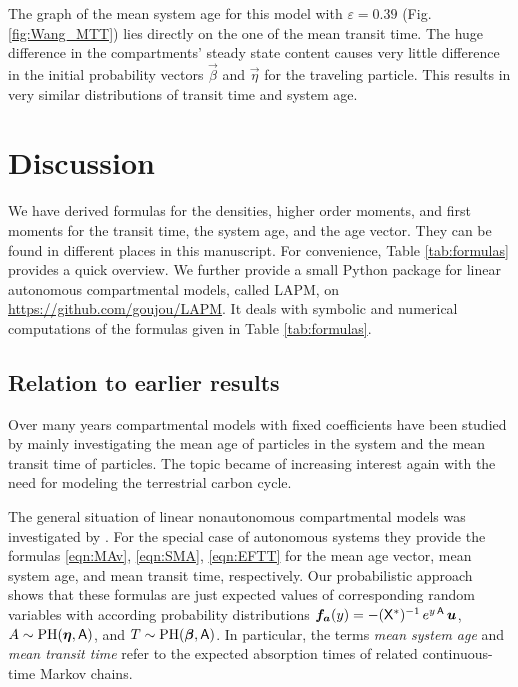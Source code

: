 \documentclass[smallextended]{svjour3}
\begin{document}
The graph of the mean system age for this model with $\varepsilon = 0.39$ (Fig. \ref{fig:Wang_MTT}) lies directly on the one of the mean transit time.
The huge difference in the compartments' steady state content causes very little difference in the initial probability vectors $\vec{\beta}$ and $\vec{\eta}$ for the traveling particle.
This results in very similar distributions of transit time and system age.

\section{Discussion}
We have derived formulas for the densities, higher order moments, and first moments for the transit time, the system age, and the age vector.
They can be found in different places in this manuscript.
For convenience, Table \ref{tab:formulas} provides a quick overview.
We further provide a small Python package for linear autonomous compartmental models, called LAPM, on \url{https://github.com/goujou/LAPM}.
It deals with symbolic and numerical computations of the formulas given in Table \ref{tab:formulas}.

\subsection{Relation to earlier results}
Over many years compartmental models with fixed coefficients have been studied \citep{Eriksson1971ARoEaS, bolin1973Tellus, Anderson1983} by mainly investigating the mean age of particles in the system and the mean transit time of particles.
The topic became of increasing interest again with the need for modeling the terrestrial carbon cycle.

The general situation of linear nonautonomous compartmental models was investigated by \citet{Rasmussen2016JMB}.
For the special case of autonomous systems they provide the formulas \eqref{eqn:MAv}, \eqref{eqn:SMA}, \eqref{eqn:EFTT} for the mean age vector, mean system age, and mean transit time, respectively.
Our probabilistic approach shows that these formulas are just expected values of corresponding random variables with according probability distributions $\vec{f_a}(y) = -(\tens{X}^\ast)^{-1}\, e^{y\,\tens{A}}\,\vec{u}$, $A\sim\operatorname{PH}(\vec{\eta},\tens{A})$, and $T\sim\operatorname{PH}(\vec{\beta}, \tens{A})$.
In particular, the terms \emph{mean system age} and \emph{mean transit time} refer to the expected absorption times of related continuous-time Markov chains.
\end{document}
